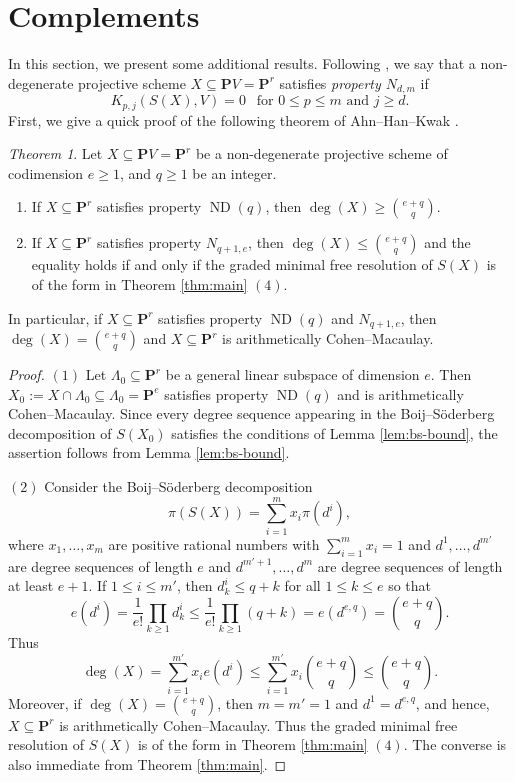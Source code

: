 \documentclass[12pt]{amsart}
\theoremstyle{definition}
\theoremstyle{remark}
\theoremstyle{corollary}
\theoremstyle{theorem}
\theoremstyle{corollary}
\newtheorem{theorem}{Theorem}[section]
\theoremstyle{corollary}
\theoremstyle{definition}
\theoremstyle{remark}
\numberwithin{equation}{section}
\def\nP{\mathbf{P}}
\DeclareMathOperator{\ND}{ND}
\begin{document}
\section{Complements}\label{sec:complements}
In this section, we present some additional results. Following \cite{EGHP}, we say that a non-degenerate projective scheme $X \subseteq \nP V = \nP^r$ satisfies \emph{property $N_{d,m}$} if
$$
K_{p,j}(S(X), V) = 0~~\text{ for $0 \leq p \leq m$ and $j \geq d$}.
$$
First, we give a quick proof of the following theorem of Ahn--Han--Kwak \cite[Theorem 1.2 and Corollary 3.4]{AHK}.

\begin{theorem}
Let $X \subseteq \nP V = \nP^r$ be a non-degenerate projective scheme of codimension $e \geq 1$, and $q \geq 1$ be an integer.
\begin{enumerate}
\item If $X \subseteq \nP^r$ satisfies property $\ND(q)$, then $\deg(X) \geq {e+q \choose q}$.
\item If $X \subseteq \nP^r$ satisfies property $N_{q+1,e}$, then $\deg(X) \leq {e+q \choose q}$ and the equality holds if and only if the graded minimal free resolution of $S(X)$ is of the form in Theorem \ref{thm:main} $(4)$.
\end{enumerate}
In particular, if $X \subseteq \nP^r$ satisfies property $\ND(q)$ and $N_{q+1,e}$, then $\deg(X) ={e+q \choose q}$ and $X \subseteq \nP^r$ is arithmetically Cohen--Macaulay.
\end{theorem}

\begin{proof}
$(1)$ Let $\Lambda_0 \subseteq \nP^r$ be a general linear subspace of dimension $e$. Then $X_0:=X \cap \Lambda_0 \subseteq \Lambda_0 = \nP^e$ satisfies property $\ND(q)$ and is arithmetically Cohen--Macaulay. Since every degree sequence appearing in the Boij--S\"{o}derberg decomposition of $S(X_0)$ satisfies the conditions of Lemma \ref{lem:bs-bound}, the assertion follows from Lemma \ref{lem:bs-bound}.

\medskip

\noindent $(2)$ Consider the Boij--S\"{o}derberg decomposition
$$
\pi(S(X)) = \sum_{i=1}^m x_i\pi(d^i),
$$
where $x_1, \ldots, x_m$ are positive rational numbers with $\sum_{i=1}^m x_i = 1$ and $d^1, \ldots, d^{m'}$ are degree sequences of length $e$ and $d^{m'+1}, \ldots, d^m$ are degree sequences of length at least $e+1$. If $1 \leq i \leq m'$, then $d_k^i \leq q+k$ for all $1 \leq k \leq e$ so that
$$
e(d^i) = \frac{1}{e!} \prod_{k \geq 1} d_k^i \leq \frac{1}{e!} \prod_{k \geq 1} (q+k) = e(d^{e,q}) = {e+q \choose q}.
$$
Thus
$$
\deg(X) = \sum_{i=1}^{m'} x_i e(d^i) \leq \sum_{i=1}^{m'} x_i {e+q \choose q} \leq  {e+q \choose q}.
$$
Moreover, if $\deg(X) = {e+q \choose q}$, then  $m=m'=1$ and $d^1 = d^{e,q}$, and hence, $X \subseteq \nP^r$ is arithmetically Cohen--Macaulay. Thus the graded minimal free resolution of $S(X)$ is of the form in Theorem \ref{thm:main} $(4)$. The converse is also immediate from Theorem \ref{thm:main}.
\end{proof}
\end{document}
